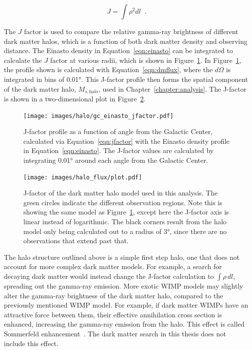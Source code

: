     \begin{equation}\label{eqn:jfactor}
      J = \int \rho^2 dl \;\; .
    \end{equation}

    The $J$ factor is used to compare the relative gamma-ray brightness of different dark matter halos, which is a function of both dark matter density and observing distance.
    The Einasto density in Equation~\ref{eqn:einasto} can be integrated to calculate the $J$ factor at various radii, which is shown in Figure~\ref{fig:gchalo_jfactor}.
    In Figure~\ref{fig:gchalo_jfactor}, the profile shown is calculated with Equation~\ref{eqn:dmflux}, where the $d\Omega$ is integrated in bins of \ang{0.01}.
    This J-factor profile then forms the spatial component of the dark matter halo, $M_{s,\textrm{halo}}$, used in Chapter~\ref{chapter:analysis}.
    The J-factor is shown in a two-dimensional plot in Figure~\ref{fig:halojfactor}.
    
    \begin{figure}[ht]
    \centering
      \texttt{[image: images/halo/gc\_einasto\_jfactor.pdf]}
      \caption[Galactic Center Einasto Halo Jfactor]{
        J-factor profile as a function of angle from the Galactic Center, calculated via Equation~\ref{eqn:jfactor} with the Einasto density profile in Equation~\ref{eqn:einasto}.
        The J-factor values are calculated by integrating \ang{0.01} around each angle from the Galactic Center.
      }
      \label{fig:gchalo_jfactor}
    \end{figure}
  
  \begin{figure}[ht]
    \centering
    \texttt{[image: images/halo\_flux/plot.pdf]}
    \caption[Galactic Center Halo J-factor Skymap]{
      J-factor of the dark matter halo model used in this analysis.
      The green circles indicate the different observation regions.
      Note this is showing the same model as Figure~\ref{fig:gchalo_jfactor}, except here the J-factor axis is linear instead of logarithmic.
      The black corners result from the halo model only being calculated out to a radius of \ang{3}, since there are no observations that extend past that.
    }
    \label{fig:halojfactor}
  \end{figure}

  The halo structure outlined above is a simple first step halo, one that does not account for more complex dark matter models.
  For example, a search for decaying dark matter would instead change the J-factor calculation to $\int \rho \, dl$, spreading out the gamma-ray emission.
  More exotic WIMP models may slightly alter the gamma-ray brightness of the dark matter halo, compared to the previously mentioned WIMP model.
  For example, if dark matter WIMPs have an attractive force between them, their effective annihilation cross section is enhanced, increasing the gamma-ray emission from the halo.
  This effect is called Sommerfeld enhancement~\cite{sommerfeld}.
  The dark matter search in this thesis does not include this effect.
    
